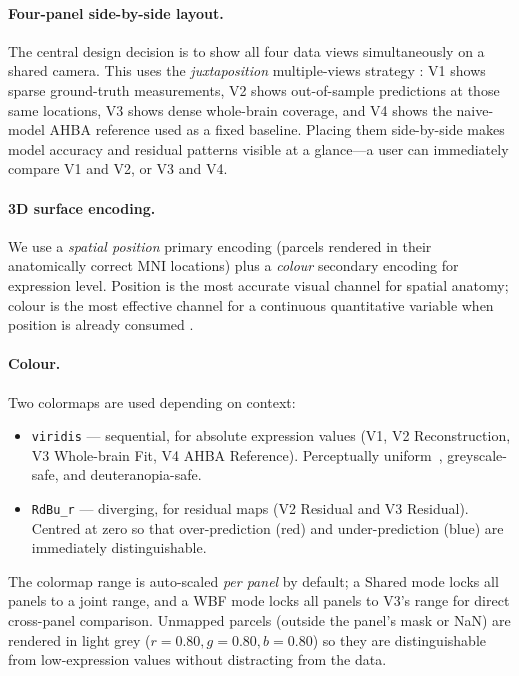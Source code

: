 \documentclass[11pt,letterpaper]{article}
\begin{document}
\paragraph{Four-panel side-by-side layout.}
The central design decision is to show all four data views simultaneously
on a shared camera.
This uses the \emph{juxtaposition} multiple-views strategy
\citep{gleicher2011}:
V1 shows sparse ground-truth measurements, V2 shows out-of-sample predictions
at those same locations, V3 shows dense whole-brain coverage, and V4 shows
the naive-model AHBA reference used as a fixed baseline.
Placing them side-by-side makes model accuracy and residual patterns visible
at a glance—a user can immediately compare V1 and V2, or V3 and V4.

\paragraph{3D surface encoding.}
We use a \emph{spatial position} primary encoding (parcels rendered in
their anatomically correct MNI locations) plus a \emph{colour} secondary
encoding for expression level.
Position is the most accurate visual channel for spatial anatomy; colour
is the most effective channel for a continuous quantitative variable when
position is already consumed \citep{mackinlay1986}.

\paragraph{Colour.}
Two colormaps are used depending on context:
\begin{itemize}[nosep]
  \item \texttt{viridis} — sequential, for absolute expression values (V1,
        V2 Reconstruction, V3 Whole-brain Fit, V4 AHBA Reference).
        Perceptually uniform~\citep{liu2018}, greyscale-safe, and
        deuteranopia-safe.
  \item \texttt{RdBu\_r} — diverging, for residual maps (V2 Residual and
        V3 Residual).
        Centred at zero so that over-prediction (red) and under-prediction
        (blue) are immediately distinguishable.
\end{itemize}
The colormap range is auto-scaled \emph{per panel} by default; a Shared
mode locks all panels to a joint range, and a WBF mode locks all panels
to V3's range for direct cross-panel comparison.
Unmapped parcels (outside the panel's mask or NaN) are rendered in light
grey ($r{=}0.80, g{=}0.80, b{=}0.80$) so they are distinguishable
from low-expression values without distracting from the data.
\end{document}

